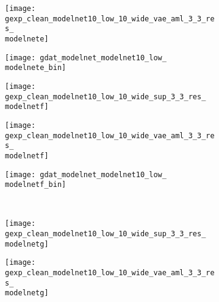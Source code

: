 \begin{figure}[t!]
{\begin{subfigure}[t]{0.07\textwidth}
    \end{subfigure}
    \begin{subfigure}[t]{0.07\textwidth}
        \vspace{0px}\centering
        \texttt{[image: gexp\_clean\_modelnet10\_low\_10\_wide\_vae\_aml\_3\_3\_res\_\\modelnete]}
    \end{subfigure}
    \begin{subfigure}[t]{0.07\textwidth}
        \vspace{0px}\centering
        \texttt{[image: gdat\_modelnet\_modelnet10\_low\_\\modelnete\_bin]}
    \end{subfigure}
    \begin{subfigure}[t]{0.07\textwidth}
        \vspace{0px}\centering
        \texttt{[image: gexp\_clean\_modelnet10\_low\_10\_wide\_sup\_3\_3\_res\_\\modelnetf]}
    \end{subfigure}
    \begin{subfigure}[t]{0.07\textwidth}
        \vspace{0px}\centering
        \texttt{[image: gexp\_clean\_modelnet10\_low\_10\_wide\_vae\_aml\_3\_3\_res\_\\modelnetf]}
    \end{subfigure}
    \begin{subfigure}[t]{0.07\textwidth}
        \vspace{0px}\centering
        \texttt{[image: gdat\_modelnet\_modelnet10\_low\_\\modelnetf\_bin]}
    \end{subfigure}
    \\[-4px]
    \begin{subfigure}[t]{0.07\textwidth}
        \vspace{0px}\centering
        \texttt{[image: gexp\_clean\_modelnet10\_low\_10\_wide\_sup\_3\_3\_res\_\\modelnetg]}
    \end{subfigure}
    \begin{subfigure}[t]{0.07\textwidth}
        \vspace{0px}\centering
        \texttt{[image: gexp\_clean\_modelnet10\_low\_10\_wide\_vae\_aml\_3\_3\_res\_\\modelnetg]}

\end{subfigure}}
\end{figure}
